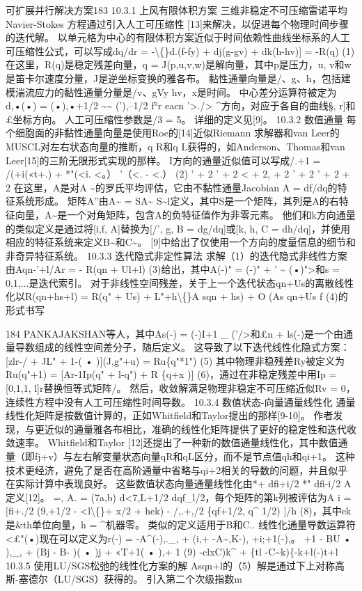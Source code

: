 \documentclass[UTF8,11pt,a4paper,openany,fontset=fandol]{ctexbook}
\begin{document}
可扩展并行解决方案183 10.3.1 上风有限体积方案 三维非稳定不可压缩雷诺平均 Navier-Stokes 方程通过引入人工可压缩性 [13]来解决，以促进每个物理时间步骤的迭代解。 以单元格为中心的有限体积方案近似于时间依赖性曲线坐标系的人工可压缩性公式，可以写成dq/dr = -\textbackslash\{\}d.(f-fy) + dj(g-gv) + dk(h-hv)] = -R(q) (1)在这里，R(q)是稳定残差向量，q = J(p,u,v,w)是解向量，其中p是压力，u, v和w是笛卡尔速度分量，J是逆坐标变换的雅各布。 黏性通量向量是/、g、h，包括建模湍流应力的黏性通量分量是/v、gVy hv，x是时间。 中心差分运算符被定为d,•(•) = (•),•+1/2 \textasciitilde{}\textasciitilde{} ('),--1/2 f°r eacn '>./> \textasciicircum{}方向，对应于各自的曲线§, r]和£坐标方向。 人工可压缩性参数是/3 = 5。 详细的定义见[9]。 10.3.2 数值通量 每个细胞面的非黏性通量向量是使用Roe的[14]近似Riemann 求解器和van Leer的MUSCL对左右状态向量的推断，q R和q L获得的，如Anderson、Thomas和van Leer[15]的三阶无限形式实现的那样。 I方向的通量近似值可以写成/.+1 = /(+i(«t+.) + *"(<i. <。） '（<. - <.） (2) ' + 2 ' + 2 < + 2, + 2 ' + 2 ' + 2 + 2 在这里，A是对A \textasciitilde{}的罗氏平均评估，它由不黏性通量Jacobian A = df/dq的特征系统形成。 矩阵A”由A\textasciitilde{} = SA\textasciitilde{} S\textasciitilde{}l定义，其中S是一个矩阵，其列是A的右特征向量，A\textasciitilde{}是一个对角矩阵，包含A的负特征值作为非零元素。 他们和k方向通量的类似定义是通过将[i,f, A]替换为[/', g, B = dg/dq]或[k, h, C = dh/dq]，并使用相应的特征系统来定义B\textasciitilde{}和C\textasciitilde{}。 [9]中给出了仅使用一个方向的度量信息的细节和非奇异特征系统。 10.3.3 迭代隐式非定性算法 求解（1）的迭代隐式非线性方案由Aqn-'+l/Ar = - R(qn + Ul+l) (3)给出，其中A(-)" = (-)" + ' \textasciitilde{} (•)">和s = 0,1,...是迭代索引。 对于非线性空间残差，关于上一个迭代状态qn+Us的离散线性化以R(qn+hs+l) = R(q" + Us) + L"+h\textbackslash\{\}A sqn + hs) + O (As qn+Us f (4)的形式书写

184 PANKAJAKSHAN等人，其中As(-) = (-)I+1 \_ ('/>和£n + ls(-)是一个由通量导数组成的线性空间差分子，随后定义。 这导致了以下迭代线性化隐式方案：[zlr-/ + JL" + 1-( • )](J,g"+u) = Ru\{q"*1") (5) 其中物理非稳残差Ry被定义为Ru(q"+1) = [Ar-1Ip(q" + l-q") + R \{q+x )] (6)，通过在非稳定残差中用Ip = [0,1,1, l]r替换恒等式矩阵/。 然后，收敛解满足物理非稳定不可压缩近似Rv = 0，连续性方程中没有人工可压缩性时间导数。 10.3.4 数值状态-向量通量线性化 通量线性化矩阵是按数值计算的，正如Whitfield和Taylor提出的那样[9-10]。 作者发现，与更近似的通量雅各布相比，准确的线性化矩阵提供了更好的稳定性和迭代收敛速率。 Whitfield和Taylor [12]还提出了一种新的数值通量线性化，其中数值通量（即fj+v）与左右解变量状态向量qR和qL区分，而不是节点值qh和qi+1。 这种技术更经济，避免了是否在高阶通量中省略与qi+2相关的导数的问题，并且似乎在实际计算中表现良好。 这些数值状态向量通量线性化由*+ dfi+i/2 *" dfi-i/2 A定义[12]。 =, A. = (7a,b) d<7,L+1/2 dqf\_l/2，每个矩阵的第k列被评估为A i = [fi+./2 (9,+1/2 - <l\textbackslash\{\}+ x/2 + hek) - /,.+,/2 \{qf+1/2, q\textasciicircum{} 1/2) ]/h (8)，其中ek是\&th单位向量，h = \textasciicircum{}机器零。 类似的定义适用于B和C.. 线性化通量导数运算符<£"(•)现在可以定义为r(-) = -A\textasciicircum{}(-),.\_, + (i,+ -A\textasciitilde{},K-), +i;+1(-),。 +1 - BU • ),\_, + (Bj - B- )( • )j + «T+1( • ),+ 1 (9) -clxC)k\textasciicircum{} + \{tl -C\textasciitilde{}k)\{-k+l(-)t+l 10.3.5 使用LU/SGS松弛的线性化方案的解 Asqn+l的（5）解是通过下上对称高斯-塞德尔（LU/SGS）获得的。 引入第二个次级指数m
\end{document}
